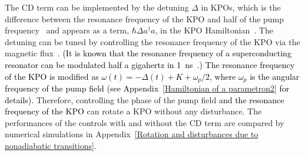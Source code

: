 \documentclass[%
 reprint,
 amsmath,amssymb,
 aps,
pra,
]{revtex4-2}
\begin{document}


The CD term can be implemented by the detuning $\Delta$ in KPOs, which is the difference between the resonance frequency of the KPO and half of the pump frequency~\cite{Goto2016,Goto2019} and appears as a term, $\hbar\Delta a^\dagger a$, in the KPO Hamiltonian~\cite{Goto2019}.
The detuning can be tuned by controlling the resonance frequency of the KPO via the magnetic flux~\cite{Wang2019}.
\textcolor{black}{(It is known that the resonance frequency of a superconducting resonator can be modulated half a gigahertz in 1~ns~\cite{ZLWang2013}.)}
\textcolor{black}{The resonance frequency of the KPO is modified as $\omega(t) = - \Delta(t)  + K + \omega_p/2$, where $\omega_p$ is the angular frequency of the pump field (see Appendix~\ref{Hamiltonian of a parametron2} for details).} 
Therefore, controlling the phase of the pump field \textcolor{black}{and the resonance frequency of the KPO} can rotate a KPO without any disturbance.
The performances of the controls with and without the CD term are compared by numerical simulations in Appendix~\ref{Rotation and disturbances due to nonadiabatic transitions}.

\end{document}
